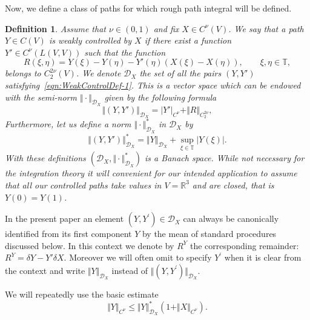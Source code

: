 \documentclass[11pt,a4paper,reqno]{amsart}%
\theoremstyle{plain}
\theoremstyle{remark}
\theoremstyle{plain}
\newtheorem{definition}[theorem]{Definition}
\numberwithin{equation}{section}
\def\Rnu{{\mathbb R}}
\begin{document}
Now, we define a class of paths for which rough path integral will
be defined.
\begin{definition}\label{def-controlled} Assume that $\nu \in (0,1)$ and  fix $X\in C^{\nu}(V)$. %
We say that a path $Y\in C(V)$ is weakly controlled by $X$ if
there exist a function $Y'\in C^{\nu}(L(V,V))$ such that the function 
\begin{equation}
R(\xi,\eta) = Y(\xi)-Y(\eta) - Y'(\eta)(X(\xi)-X(\eta)) ,\qquad\xi,\eta\in
\mathbb{T}, \label{eqn:WeakControlDef-1}
\end{equation}
belongs to $C_2^{2\nu}(V)$. We denote $\mathcal{D}_X$ the set of all the pairs $(Y,Y')$ satisfying~\eqref{eqn:WeakControlDef-1}. This is a vector space which can be endowed with the semi-norm $\Vert \cdot\Vert_{\mathcal{D}_X}$  given by the following formula
\begin{equation}
\Vert (Y,Y')\Vert_{\mathcal{D}_X}=\vert Y'\vert_{C^{\nu}}+\Vert R\Vert_{C_2^{2\nu}},\label{eqn:D_XNorm-1}
\end{equation}
Furthermore, let us define a  norm $\Vert \cdot\Vert_{\mathcal{D}_X}^\ast$  in
$\mathcal{D}_X$ by
\begin{equation}
\Vert (Y,Y')\Vert_{\mathcal{D}_X}^\ast=\Vert Y\Vert_{\mathcal{D}_X}+\sup_{\xi\in \mathbb{T}} |Y(\xi)|. \label{eqn:D_XNorm-2}
\end{equation}
With these definitions
$(\mathcal{D}_X,\Vert \cdot\Vert_{\mathcal{D}_X}^\ast)$ is a Banach space. While not necessary for the integration theory it will convenient for our intended application to assume that all our controlled paths take values in  $V=\mathbb{R}^3$ and are closed, that is $Y(0)=Y(1)$.
\end{definition}

In the present paper an element $(Y,Y^\prime)\in \mathcal{D}_X$ can always be canonically identified from its first component $Y$ by the mean of standard procedures discussed below. In this context we denote by $R^Y$ the corresponding remainder: $R^Y = \delta Y - Y' \delta X$. Moreover we will often
omit to specify $Y^\prime$ when it is clear from the context and write
$\Vert Y\Vert_{\mathcal{D}_X}$ instead of $\Vert (Y,Y^\prime)\Vert_{\mathcal{D}_X}$.

We will repeatedly use the basic estimate
\begin{equation}
\Vert Y\Vert_{C^{\nu}}\leq
\Vert Y\Vert_{\mathcal{D}_X}^*(1+\Vert X\Vert_{C^{\nu}}).\label{eqn:HolderIneq}
\end{equation}
\end{document}
